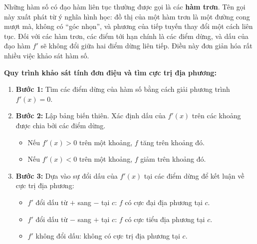 Những hàm số có đạo hàm liên tục thường được gọi là các \textbf{hàm trơn}. Tên gọi này xuất phát từ ý nghĩa hình học: đồ thị của một hàm trơn là một đường cong mượt mà, không có ``góc nhọn'', và phương của tiếp tuyến thay đổi một cách liên tục. Đối với các hàm trơn, các điểm tới hạn chính là các điểm dừng, và dấu của đạo hàm $f'$ sẽ không đổi giữa hai điểm dừng liên tiếp. Điều này đơn giản hóa rất nhiều việc khảo sát hàm số.
\begin{importantbox}
\textbf{Quy trình khảo sát tính đơn điệu và tìm cực trị địa phương:}
\begin{enumerate}
    \item \textbf{Bước 1:} Tìm các điểm dừng của hàm số bằng cách giải phương trình $f'(x) = 0$.
    \item \textbf{Bước 2:} Lập bảng biến thiên. Xác định dấu của $f'(x)$ trên các khoảng được chia bởi các điểm dừng.
    \begin{itemize}
        \item Nếu $f'(x) > 0$ trên một khoảng, $f$ tăng trên khoảng đó.
        \item Nếu $f'(x) < 0$ trên một khoảng, $f$ giảm trên khoảng đó.
    \end{itemize}
    \item \textbf{Bước 3:} Dựa vào sự đổi dấu của $f'(x)$ tại các điểm dừng để kết luận về cực trị địa phương:
    \begin{itemize}
        \item $f'$ đổi dấu từ $+$ sang $-$ tại $c$: $f$ có cực đại địa phương tại $c$.
        \item $f'$ đổi dấu từ $-$ sang $+$ tại $c$: $f$ có cực tiểu địa phương tại $c$.
        \item $f'$ không đổi dấu: không có cực trị địa phương tại $c$.
    \end{itemize}
\end{enumerate}
\end{importantbox}

